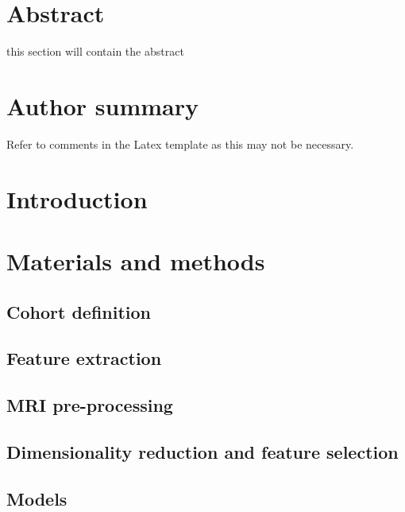 \documentclass[10pt,letterpaper]{article}
\begin{document}
\section*{Abstract}
this section will contain the abstract

\section*{Author summary}
Refer to comments in the Latex template as this may not be necessary.

\linenumbers

\section*{Introduction}



\section*{Materials and methods}


\subsection*{Cohort definition}


\subsection*{Feature extraction}


\subsection*{MRI pre-processing}


\subsection*{Dimensionality reduction and feature selection}


\subsection*{Models}

\end{document}
